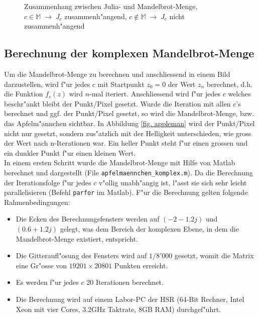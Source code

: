 \begin{refsection}
		\begin{figure}[ht!]\centering
			\begin{adjustbox}{scale=0.5, keepaspectratio}
				
			\end{adjustbox}
			\caption{Zusammenhang zwischen Julia- und Mandelbrot-Menge, $c\in\mathbb{M}\;\rightarrow\; J_c$ zusammenh"angend, $c\notin\mathbb{M}\;\rightarrow\; J_c$ nicht zusammenh"angend \cite{julia}}
			\label{fig. julia_mandelbrot}
		\end{figure}

	\subsection{Berechnung der komplexen Mandelbrot-Menge}
		Um die Mandelbrot-Menge zu berechnen und anschliessend in einem Bild darzustellen, wird f"ur jedes $c$ mit Startpunkt $z_0=0$ der Wert $z_n$ berechnet, d.h. die Funktion $f_c(z)$ wird $n$-mal iteriert. Anschliessend wird f"ur jedes $c$ welches beschr"ankt bleibt der Punkt/Pixel gesetzt. Wurde die Iteration mit allen $c$'s berechnet und ggf. der Punkt/Pixel gesetzt, so wird die Mandelbrot-Menge, bzw. das Apfelm"annchen sichtbar. In Abbildung \ref{fig. appleman} wird der Punkt/Pixel nicht nur gesetzt, sondern zus"atzlich mit der Helligkeit unterschieden, wie gross der Wert nach n-Iterationen war. Ein heller Punkt steht f"ur einen grossen und ein dunkler Punkt f"ur einen kleinen Wert.\\[0.3cm]		
		In einem ersten Schritt wurde die Mandelbrot-Menge mit Hilfe von Matlab berechnet und dargestellt (File  {\tt apfelmaennchen\_komplex.m}). Da die Berechnung der Iterationsfolge f"ur jedes $c$ v"ollig unabh"angig ist, l"asst sie sich sehr leicht parallelisieren (Befehl {\tt parfor} im Matlab). F"ur die Berechnung gelten folgende Rahmenbedingungen:
		\begin{itemize}
		 \item Die Ecken des Berechnungsfensters werden auf $(-2-1.2 j)$ und $(0.6+1.2 j)$ gelegt, was dem Bereich der komplexen Ebene, in dem die Mandelbrot-Menge existiert, entspricht.
		 \item Die Gitteraufl"osung des Fensters wird auf $1/8'000$ gesetzt, womit die Matrix eine Gr"osse von $19201\times 20801$ Punkten erreicht.
		 \item Es werden f"ur jedes $c$ 20 Iterationen berechnet.
		 \item Die Berechnung wird auf einem Labor-PC der HSR (64-Bit Rechner, Intel Xeon mit vier Cores, 3.2GHz Taktrate, 8GB RAM) durchgef"uhrt.

\end{itemize}
\end{refsection}
